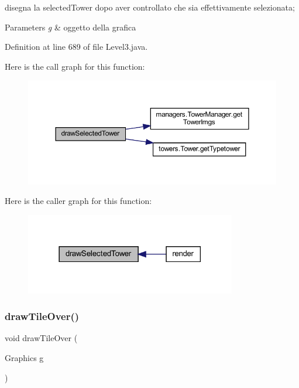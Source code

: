 disegna la selected\+Tower dopo aver controllato che sia effettivamente selezionata; 


\begin{DoxyParams}{Parameters}
{\em g} & oggetto della grafica \\
\hline
\end{DoxyParams}


Definition at line 689 of file Level3.\+java.

Here is the call graph for this function\+:\nopagebreak
\begin{figure}[H]
\begin{center}
\leavevmode
\includegraphics[width=350pt]{classscenes_1_1_level3_a0a97d0bb6d32640b2ae351707946abf7_cgraph}
\end{center}
\end{figure}
Here is the caller graph for this function\+:\nopagebreak
\begin{figure}[H]
\begin{center}
\leavevmode
\includegraphics[width=261pt]{classscenes_1_1_level3_a0a97d0bb6d32640b2ae351707946abf7_icgraph}
\end{center}
\end{figure}
\mbox{\label{classscenes_1_1_level3_ac299bbbbb70f97ae032c1345d5937378}} 
\subsubsection{\texorpdfstring{draw\+Tile\+Over()}{drawTileOver()}}
{\footnotesize\ttfamily void draw\+Tile\+Over (\begin{DoxyParamCaption}\item[{Graphics}]{g }\end{DoxyParamCaption})\hspace{0.3cm}{\ttfamily [private]}}



